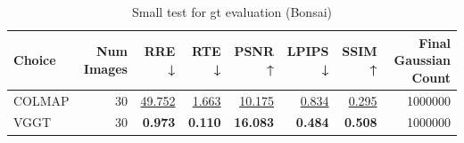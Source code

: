 \begin{table}[H]
\caption{Small test for gt evaluation (Bonsai)}
\label{tab:06_gt_bonsai}
\begin{tabular}{lrrrrrrr}
\toprule
Choice & Num Images & RRE ↓ & RTE ↓ & PSNR ↑ & LPIPS ↓ & SSIM ↑ & Final Gaussian Count \\
\midrule
COLMAP & 30 & \underline{49.752} & \underline{1.663} & \underline{10.175} & \underline{0.834} & \underline{0.295} & 1000000 \\
VGGT & 30 & \textbf{0.973} & \textbf{0.110} & \textbf{16.083} & \textbf{0.484} & \textbf{0.508} & 1000000 \\
\bottomrule
\end{tabular}
\end{table}
